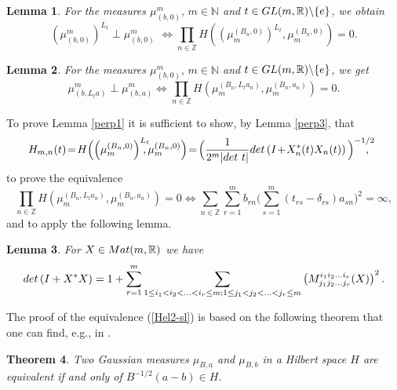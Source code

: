 \documentclass[preprint,12pt]{elsarticle}
\newtheorem{thm}{Theorem}[section]
\newtheorem{lem}[thm]{Lemma}
\numberwithin{equation}{section}
\begin{document}
\begin{lem}
\label{l7.2}
 For the measures $\mu_{(b,0)}^m,\,m\in{\mathbb N}$ and $t\in
 {\rm GL}(m,{\mathbb R})\backslash\{e\}$, we obtain
$$
(\mu_{(b,0)}^m)^{L_t}\perp\mu_{(b,0)}^m\,\, \Leftrightarrow
\prod_{n\in{\mathbb
Z}}H\left(\left(\mu_m^{(B_n,0)}\right)^{L_t},\mu_m^{(B_n,0)}\right)=0.
$$
\end{lem}
\begin{lem}
\label{l7.3}
For the  measures $\mu_{(b,0)}^m,\,m\in{\mathbb N}$ and $t\in
 {\rm GL}(m,{\mathbb R})\backslash\{e\}$, we get
$$
\mu_{(b,{L_t}a)}^m\perp\mu_{(b,a)}^m \Leftrightarrow
\prod_{n\in{\mathbb
Z}}H\left(\mu_m^{(B_n,{L_t}a_n)},\mu_m^{(B_n,a_n)}\right)=0.
$$
\end{lem}
To prove Lemma \ref{perp1} it is sufficient to show, by Lemma
\ref{perp3}, that
\begin{equation}
\label{Hel1-sl}
H_{m,n}(t)\!=\!H\Big(\Big(\mu_m^{(B_n,0)}\Big)^{L_t}\!\!\!\!,\mu_m^{(B_n,0)}\Big)\!=\!
\Big(\frac{1}{2^m\vert{\rm det}\,\,t\vert} {\rm
det}\left(I\!+\!X_n^*(t)X_n(t)\right)\Big)^{-1/2}\!\!\!\!\!,\quad
\end{equation}
to  prove the  equivalence
\begin{equation}
\label{Hel2-sl}
 \prod_{n\in{\mathbb
Z}}H\left(\mu_m^{(B_n,{L_t}a_n)},\mu_m^{(B_n,a_n)}\right)=0
\Leftrightarrow \sum_{n\in {\mathbb Z}}\sum_{r=1}^m
b_{rn}\Big(\sum_{s=1}^m(t_{rs}-\delta_{rs})a_{sn}\Big)^2 =\infty,
\end{equation}
and to  apply  the following lemma.
\begin{lem}
\label{ldet*}
 For $X\in {\rm Mat}(m,{\mathbb R})$ we have
\begin{equation}
\label{det*} {\rm det}\left(I+X^*X\right)= 1+\sum_{r=1}^{m}
\sum_{1\leq i_1<i_2<...<i_r\leq m;1\leq j_1<j_2<...<j_r\leq m}
\left(M^{i_1i_2...i_r}_{j_1j_2...j_r}(X)\right)^2.
\end{equation}
\end{lem}

The proof of  the equivalence (\ref{Hel2-sl}) is based on the following theorem
that one can find, e.g., in \cite[ Ch.\,III, \S 16, Theorem 2]{Sko74}.
\begin{thm}
\label{t.(B,a)sim(B,0)}
 Two Gaussian measures $\mu_{B,a}$ and $\mu_{B,b}$ in a Hilbert space $H$ are
equivalent if and only of $B^{-1/2}(a-b)\in H$.
\end{thm}
\end{document}

